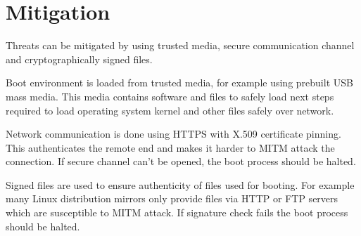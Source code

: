 \section{Mitigation}

Threats can be mitigated by using trusted media, secure communication
channel and cryptographically signed files.

Boot environment is loaded from trusted media, for example using
prebuilt USB mass media. This media contains software and files to
safely load next steps required to load operating system kernel and
other files safely over network.

Network communication is done using HTTPS with X.509 certificate
pinning. This authenticates the remote end and makes it harder to MITM
attack the connection. If secure channel can't be opened, the
boot process should be halted.

Signed files are used to ensure authenticity of files used for
booting. For example many Linux distribution mirrors only provide
files via HTTP or FTP servers which are susceptible to MITM attack. If
signature check fails the boot process should be halted.
